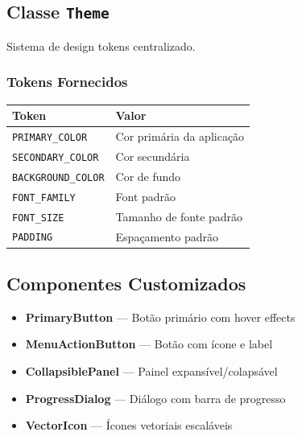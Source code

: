 \documentclass[12pt,a4paper]{article}
\begin{document}
\subsection{Classe \texttt{Theme}}

Sistema de design tokens centralizado.

\subsubsection{Tokens Fornecidos}

\begin{table}[h]
\centering
\begin{tabular}{|l|l|}
\hline
\textbf{Token} & \textbf{Valor} \\
\hline
\texttt{PRIMARY\_COLOR} & Cor primária da aplicação \\
\hline
\texttt{SECONDARY\_COLOR} & Cor secundária \\
\hline
\texttt{BACKGROUND\_COLOR} & Cor de fundo \\
\hline
\texttt{FONT\_FAMILY} & Font padrão \\
\hline
\texttt{FONT\_SIZE} & Tamanho de fonte padrão \\
\hline
\texttt{PADDING} & Espaçamento padrão \\
\hline
\end{tabular}
\end{table}

\subsection{Componentes Customizados}

\begin{itemize}
    \item \textbf{PrimaryButton} — Botão primário com hover effects
    \item \textbf{MenuActionButton} — Botão com ícone e label
    \item \textbf{CollapsiblePanel} — Painel expansível/colapsável
    \item \textbf{ProgressDialog} — Diálogo com barra de progresso
    \item \textbf{VectorIcon} — Ícones vetoriais escaláveis
\end{itemize}

\newpage

\end{document}
